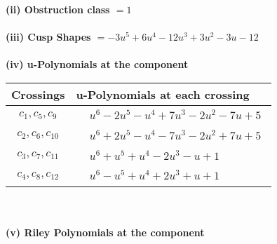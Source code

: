 \documentclass[1p]{elsarticle_modified}
\theoremstyle{definition}
\begin{document}
\flushleft \textbf{(ii) Obstruction class $= 1$}\\~\\
\flushleft \textbf{(iii) Cusp Shapes $= -3 u^5+6 u^4-12 u^3+3 u^2-3 u-12$}\\~\\
\newpage\renewcommand{\arraystretch}{1}
\flushleft \textbf{(iv) u-Polynomials at the component}\newline \\
\begin{tabular}{m{50pt}|m{274pt}}
Crossings & \hspace{64pt}u-Polynomials at each crossing \\
\hline $$\begin{aligned}c_{1},c_{5},c_{9}\end{aligned}$$&$\begin{aligned}
&u^6-2 u^5- u^4+7 u^3-2 u^2-7 u+5
\end{aligned}$\\
\hline $$\begin{aligned}c_{2},c_{6},c_{10}\end{aligned}$$&$\begin{aligned}
&u^6+2 u^5- u^4-7 u^3-2 u^2+7 u+5
\end{aligned}$\\
\hline $$\begin{aligned}c_{3},c_{7},c_{11}\end{aligned}$$&$\begin{aligned}
&u^6+u^5+u^4-2 u^3- u+1
\end{aligned}$\\
\hline $$\begin{aligned}c_{4},c_{8},c_{12}\end{aligned}$$&$\begin{aligned}
&u^6- u^5+u^4+2 u^3+u+1
\end{aligned}$\\
\hline
\end{tabular}\\~\\
\newpage\renewcommand{\arraystretch}{1}
\flushleft \textbf{(v) Riley Polynomials at the component}\newline \\
\end{document}
